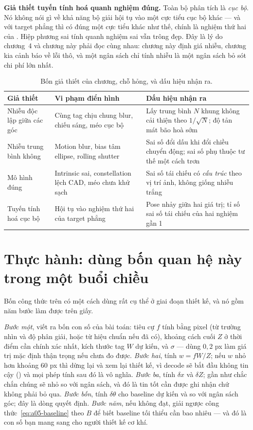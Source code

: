 \documentclass[../../marker.tex]{subfiles}
\begin{document}
\textbf{Giả thiết tuyến tính hoá quanh nghiệm đúng.} Toàn bộ phân tích là \emph{cục bộ}. Nó không nói gì về khả năng bộ giải hội tụ vào một cực tiểu cục bộ khác --- và với target phẳng thì có đúng một cực tiểu khác như thế, chính là nghiệm thứ hai của . Hiệp phương sai tính quanh nghiệm sai vẫn trông đẹp. Đây là lý do chương~4 và chương này phải đọc cùng nhau: chương này định giá nhiễu, chương kia cảnh báo về lỗi thô, và một ngân sách chỉ tính nhiễu là một ngân sách bỏ sót chi phí lớn nhất.

\begin{table}[H]\centering\small
\caption{Bốn giả thiết của chương, chỗ hỏng, và dấu hiệu nhận ra.}
\label{tab:a05-gia-thiet}
\begin{tabularx}{\linewidth}{@{}L{3.1cm}L{4.1cm}Y@{}}
\toprule
\textbf{Giả thiết} & \textbf{Vi phạm điển hình} & \textbf{Dấu hiệu nhận ra}\\
\midrule
Nhiễu độc lập giữa các góc & Cùng tag chịu chung blur, chiếu sáng, méo cục bộ & Lấy trung bình \(N\) khung không cải thiện theo \(1/\sqrt{N}\); độ tản mát bão hoà sớm\\
Nhiễu trung bình không & Motion blur, bias tâm ellipse, rolling shutter & Sai số đổi dấu khi đổi chiều chuyển động; sai số phụ thuộc tư thế một cách trơn\\
Mô hình đúng & Intrinsic sai, constellation lệch CAD, méo chưa khử sạch & Sai số tái chiếu có \emph{cấu trúc} theo vị trí ảnh, không giống nhiễu trắng\\
Tuyến tính hoá cục bộ & Hội tụ vào nghiệm thứ hai của target phẳng & Pose nhảy giữa hai giá trị; tỉ số sai số tái chiếu của hai nghiệm gần 1\\
\bottomrule
\end{tabularx}
\end{table}

\section{Thực hành: dùng bốn quan hệ này trong một buổi chiều}

Bốn công thức trên có một cách dùng rất cụ thể ở giai đoạn thiết kế, và nó gồm năm bước làm được trên giấy.

\emph{Bước một}, viết ra bốn con số của bài toán: tiêu cự \(f\) tính bằng pixel (từ trường nhìn và độ phân giải, hoặc từ hiệu chuẩn nếu đã có), khoảng cách cuối \(Z\) ở thời điểm cần chính xác nhất, kích thước tag \(W\) dự kiến, và \(\sigma\) --- dùng \(0{,}2\) px làm giá trị mặc định thận trọng nếu chưa đo được. \emph{Bước hai}, tính \(w = fW/Z\); nếu \(w\) nhỏ hơn khoảng 60 px thì dừng lại và xem lại thiết kế, vì decode sẽ bắt đầu không tin cậy () và mọi phép tính sau đó là vô nghĩa. \emph{Bước ba}, tính \(\delta x\) và \(\delta Z\); gần như chắc chắn chúng sẽ nhỏ so với ngân sách, và đó là tin tốt cần được ghi nhận chứ không phải bỏ qua. \emph{Bước bốn}, tính \(\delta\theta\) cho baseline dự kiến và so với ngân sách góc; đây là dòng quyết định. \emph{Bước năm}, nếu không đạt, giải ngược công thức~\eqref{eq:a05-baseline} theo \(B\) để biết baseline tối thiểu cần bao nhiêu --- và đó là con số bạn mang sang cho người thiết kế cơ khí.
\end{document}
